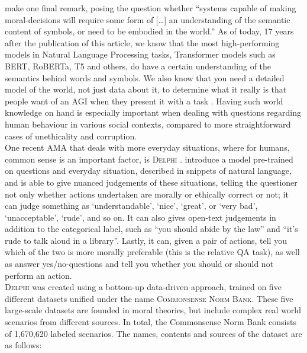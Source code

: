 \documentclass[final]{clv3} %
\begin{document}
\citet{allen2005} make one final remark, posing the question whether “systems capable of making moral-decisions will require some form of […] an understanding of the semantic content of symbols, or need to be embodied in the world.” As of today, 17 years after the publication of this article, we know that the most high-performing models in Natural Language Processing tasks, Transformer models such as BERT, RoBERTa, T5 and others, do have a certain understanding of the semantics behind words and symbols. We also know that you need a detailed model of the world, not just data about it, to determine what it really is that people want of an AGI when they present it with a task \cite{tegmark}. Having such world knowledge on hand is especially important when dealing with questions regarding human behaviour in various social contexts, compared to more straightforward cases of unethicality and corruption. \\

One recent AMA that deals with more everyday situations, where for humans, common sense is an important factor, is \textsc{Delphi} \cite{jiang}. \citet{jiang} introduce a model pre-trained on questions and everyday situation, described in snippets of natural language, and is able to give nuanced judgements of these situations, telling the questioner not only whether actions undertaken are morally or ethically correct or not; it can judge something as ‘understandable’, ‘nice’, ‘great’, or ‘very bad’, ‘unacceptable’, ‘rude’, and so on. It can also gives open-text judgements in addition to the categorical label, such as “you should abide by the law” and “it’s rude to talk aloud in a library”. Lastly, it can, given a pair of actions, tell you which of the two is more morally preferable (this is the relative QA task), as well as answer yes/no-questions and tell you whether you should or should not perform an action.\\

\textsc{Delphi} was created using a bottom-up data-driven approach, trained on five different datasets unified under the name \textsc{Commonsense Norm Bank}. These five large-scale datasets are founded in moral theories, but include complex real world scenarios from different sources. In total, the Commonsense Norm Bank consists of 1,670,620 labeled scenarios. The names, contents and sources of the dataset are as follows:
\end{document}
